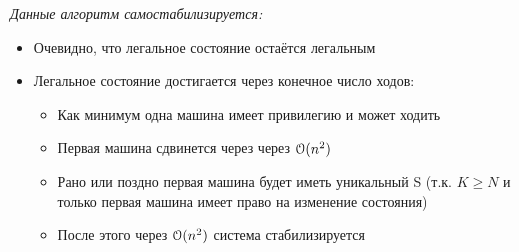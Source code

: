 \begin{theorem} \textit{Данные алгоритм самостабилизируется:}
    \begin{itemize}
        \item Очевидно, что легальное состояние остаётся легальным
        \item Легальное состояние достигается через конечное число ходов:
            \begin{itemize}
                \item Как минимум одна машина имеет привилегию и может ходить
                \item Первая машина сдвинется через через $\mathcal{O}(n^2)$
                \item Рано или поздно первая машина будет иметь уникальный S
                    (т.к. $K \geqslant N$ и только первая машина имеет право на изменение состояния)
                \item После этого через $\mathcal{O}(n^2)$ система стабилизируется
            \end{itemize}
    \end{itemize}
\end{theorem}
